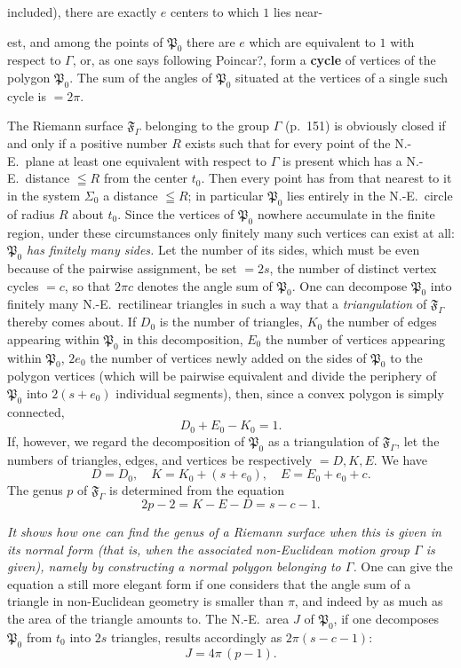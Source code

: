 \documentclass{article}
\begin{document}
included), there are exactly $e$ centers to which $1$ lies near-

est, and among the points of $\mathfrak{P}_0$ there are $e$ which are equivalent to $1$ with respect to $\varGamma$, or, as one says following Poincar?, form a \textbf{cycle} of vertices of the polygon $\mathfrak{P}_0$. The sum of the angles of $\mathfrak{P}_0$ situated at the vertices of a single such cycle is $= 2\pi$.

The Riemann surface $\mathfrak{F}_\varGamma$ belonging to the group $\varGamma$ (p.~151) is obviously closed if and only if a positive number $R$ exists such that for every point of the N.-E.\ plane at least one equivalent with respect to $\varGamma$ is present which has a N.-E.\ distance $\leqq R$ from the center $t_0$. Then every point has from that nearest to it in the system $\Sigma_0$ a distance $\leqq R$; in particular $\mathfrak{P}_0$ lies entirely in the N.-E.\ circle of radius $R$ about $t_0$. Since the vertices of $\mathfrak{P}_0$ nowhere accumulate in the finite region, under these circumstances only finitely many such vertices can exist at all: $\mathfrak{P}_0$ \emph{has finitely many sides.} Let the number of its sides, which must be even because of the pairwise assignment, be set $= 2s$, the number of distinct vertex cycles $= c$, so that $2\pi c$ denotes the angle sum of $\mathfrak{P}_0$. One can decompose $\mathfrak{P}_0$ into finitely many N.-E.\ rectilinear triangles in such a way that a \emph{triangulation} of $\mathfrak{F}_\varGamma$ thereby comes about. If $D_0$ is the number of triangles, $K_0$ the number of edges appearing within $\mathfrak{P}_0$ in this decomposition, $E_0$ the number of vertices appearing within $\mathfrak{P}_0$, $2e_0$ the number of vertices newly added on the sides of $\mathfrak{P}_0$ to the polygon vertices (which will be pairwise equivalent and divide the periphery of $\mathfrak{P}_0$ into $2(s + e_0)$ individual segments), then, since a convex polygon is simply connected,
\[ D_0 + E_0 - K_0 = 1. \]
If, however, we regard the decomposition of $\mathfrak{P}_0$ as a triangulation of $\mathfrak{F}_\varGamma$, let the numbers of triangles, edges, and vertices be respectively $= D, K, E$. We have
\[ D = D_0, \quad K = K_0 + (s + e_0), \quad E = E_0 + e_0 + c. \]
The genus $p$ of $\mathfrak{F}_\varGamma$ is determined from the equation
\[ 2p - 2 = K - E - D = s - c - 1. \]

\emph{It shows how one can find the genus of a Riemann surface when this is given in its normal form (that is, when the associated non-Euclidean motion group $\varGamma$ is given), namely by constructing a normal polygon belonging to $\varGamma$.} One can give the equation a still more elegant form if one considers that the angle sum of a triangle in non-Euclidean geometry is smaller than $\pi$, and indeed by as much as the area of the triangle amounts to. The N.-E.\ area $J$ of $\mathfrak{P}_0$, if one decomposes $\mathfrak{P}_0$ from $t_0$ into $2s$ triangles, results accordingly as $2\pi(s - c - 1)$:
\[ J = 4\pi\,(p - 1). \]
\end{document}
